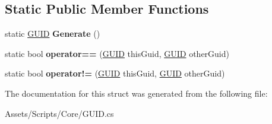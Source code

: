 \subsection*{Static Public Member Functions}
\begin{DoxyCompactItemize}
\item 
\hypertarget{struct_hattori_game2_1_1_core_1_1_g_u_i_d_ad360767c80b2018ba74d4c703e704fd4}{}static \hyperlink{struct_hattori_game2_1_1_core_1_1_g_u_i_d}{G\+U\+I\+D} {\bfseries Generate} ()\label{struct_hattori_game2_1_1_core_1_1_g_u_i_d_ad360767c80b2018ba74d4c703e704fd4}

\item 
\hypertarget{struct_hattori_game2_1_1_core_1_1_g_u_i_d_a26b5ac18fb1f9706162ec243b69ce33f}{}static bool {\bfseries operator==} (\hyperlink{struct_hattori_game2_1_1_core_1_1_g_u_i_d}{G\+U\+I\+D} this\+Guid, \hyperlink{struct_hattori_game2_1_1_core_1_1_g_u_i_d}{G\+U\+I\+D} other\+Guid)\label{struct_hattori_game2_1_1_core_1_1_g_u_i_d_a26b5ac18fb1f9706162ec243b69ce33f}

\item 
\hypertarget{struct_hattori_game2_1_1_core_1_1_g_u_i_d_a6f12bf847c9ac996c90c14c069ba30ef}{}static bool {\bfseries operator!=} (\hyperlink{struct_hattori_game2_1_1_core_1_1_g_u_i_d}{G\+U\+I\+D} this\+Guid, \hyperlink{struct_hattori_game2_1_1_core_1_1_g_u_i_d}{G\+U\+I\+D} other\+Guid)\label{struct_hattori_game2_1_1_core_1_1_g_u_i_d_a6f12bf847c9ac996c90c14c069ba30ef}

\end{DoxyCompactItemize}


The documentation for this struct was generated from the following file\+:\begin{DoxyCompactItemize}
\item 
Assets/\+Scripts/\+Core/G\+U\+I\+D.\+cs\end{DoxyCompactItemize}
